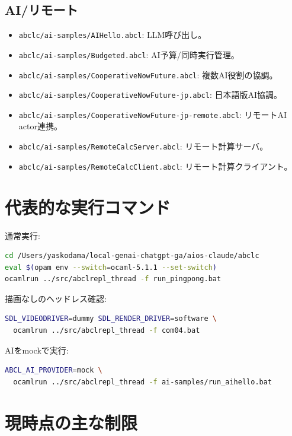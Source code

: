 \documentclass[11pt,a4paper,uplatex,dvipdfmx]{jsarticle}
\begin{document}
\subsection{AI/リモート}

\begin{itemize}
  \item \texttt{abclc/ai-samples/AIHello.abcl}: LLM呼び出し。
  \item \texttt{abclc/ai-samples/Budgeted.abcl}: AI予算/同時実行管理。
  \item \texttt{abclc/ai-samples/CooperativeNowFuture.abcl}: 複数AI役割の協調。
  \item \texttt{abclc/ai-samples/CooperativeNowFuture-jp.abcl}: 日本語版AI協調。
  \item \texttt{abclc/ai-samples/CooperativeNowFuture-jp-remote.abcl}: リモートAI actor連携。
  \item \texttt{abclc/ai-samples/RemoteCalcServer.abcl}: リモート計算サーバ。
  \item \texttt{abclc/ai-samples/RemoteCalcClient.abcl}: リモート計算クライアント。
\end{itemize}

\section{代表的な実行コマンド}

通常実行:

\begin{lstlisting}[style=aipl,language=bash]
cd /Users/yaskodama/local-genai-chatgpt-ga/aios-claude/abclc
eval $(opam env --switch=ocaml-5.1.1 --set-switch)
ocamlrun ../src/abclrepl_thread -f run_pingpong.bat
\end{lstlisting}

描画なしのヘッドレス確認:

\begin{lstlisting}[style=aipl,language=bash]
SDL_VIDEODRIVER=dummy SDL_RENDER_DRIVER=software \
  ocamlrun ../src/abclrepl_thread -f com04.bat
\end{lstlisting}

AIをmockで実行:

\begin{lstlisting}[style=aipl,language=bash]
ABCL_AI_PROVIDER=mock \
  ocamlrun ../src/abclrepl_thread -f ai-samples/run_aihello.bat
\end{lstlisting}

\section{現時点の主な制限}
\end{document}

